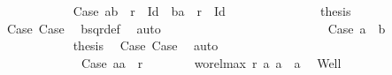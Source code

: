 \begin{isabellebody}
\ \ \ \ \ \ \ \ \ \ \ \ \ \isamarkupfalse%
\ Case{}{}{}{}{}{\isacharcolon}{\kern0pt}\ {\isachardoublequoteopen}{\isacharparenleft}{\kern0pt}a{}{\isacharcomma}{\kern0pt}b{}{\isacharparenright}{\kern0pt}\ {\isasymin}\ r\ {\isacharminus}{\kern0pt}\ Id\ {\isasymor}\ {\isacharparenleft}{\kern0pt}b{}{\isacharcomma}{\kern0pt}a{}{\isacharparenright}{\kern0pt}\ {\isasymin}\ r\ {\isacharminus}{\kern0pt}\ Id{\isachardoublequoteclose}\isanewline
\ \ \ \ \ \ \ \ \ \ \ \ \ \isamarkupfalse%
\ {\isacharquery}{\kern0pt}thesis\ \isamarkupfalse%
\ {}\ {}\ {}\ Case{}{}{}\ Case{}{}{}{}\ \isamarkupfalse%
\ bsqr{\isacharunderscore}{\kern0pt}def\ \isamarkupfalse%
\ auto\isanewline
\ \ \ \ \ \ \ \ \ \ \ \isamarkupfalse%
\isanewline
\ \ \ \ \ \ \ \ \ \ \ \ \ \isamarkupfalse%
\ Case{}{}{}{}{}{\isacharcolon}{\kern0pt}\ {\isachardoublequoteopen}a{}\ {\isacharequal}{\kern0pt}\ b{}{\isachardoublequoteclose}\isanewline
\ \ \ \ \ \ \ \ \ \ \ \ \ \isamarkupfalse%
\ {\isacharquery}{\kern0pt}thesis\ \isamarkupfalse%
\ Case{}{}{}\ Case{}{}{}{}\ \isamarkupfalse%
\ auto\isanewline
\ \ \ \ \ \ \ \ \ \ \ \isamarkupfalse%
\isanewline
\ \ \ \ \ \ \ \ \ \isamarkupfalse%
\isanewline
\ \ \ \ \ \ \ \isamarkupfalse%
\isanewline
\ \ \ \ \ \isamarkupfalse%
\isanewline
\ \ \ \isamarkupfalse%
\isanewline
\ \ \ \ \ \isamarkupfalse%
\ Case{}{\isacharcolon}{\kern0pt}\ {\isachardoublequoteopen}{\isacharparenleft}{\kern0pt}a{}{\isacharcomma}{\kern0pt}a{}{\isacharparenright}{\kern0pt}\ {\isasymin}\ r{\isachardoublequoteclose}\isanewline
\ \ \ \ \ \isamarkupfalse%
\ {}{\isacharcolon}{\kern0pt}\ {\isachardoublequoteopen}wo{\isacharunderscore}{\kern0pt}rel{\isachardot}{\kern0pt}max{}\ r\ a{}\ a{}\ {\isacharequal}{\kern0pt}\ a{}{\isachardoublequoteclose}\ \isamarkupfalse%
\ Well\ {}\ \isamarkupfalse%

\end{isabellebody}
